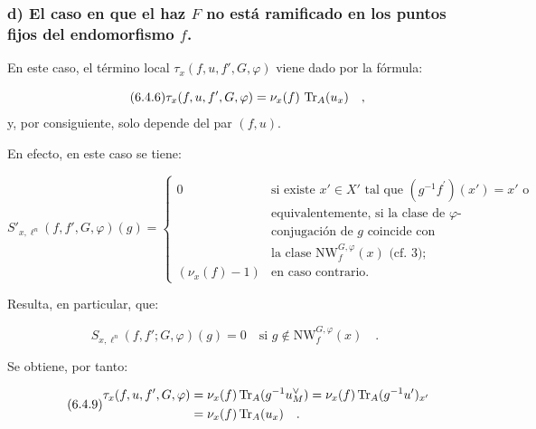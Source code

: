 \subsubsection*{d) El caso en que el haz $F$ no está ramificado en los puntos fijos del endomorfismo $f$.}

En este caso, el término local $\tau_x(f,u, f', G, \varphi)$ viene dado por la fórmula:

\begin{equation}\tag{6.4.6}
\tau_x(f,u, f', G, \varphi) = \nu_x(f) \, \operatorname{Tr}_A(u_x) \quad ,
\end{equation}
y, por consiguiente, solo depende del par $(f,u)$.

En efecto, en este caso se tiene:

\begin{equation}\tag{6.4.7}
S'_{x,\ell^n}(f, f', G, \varphi)(g) = \begin{cases}
0 & \text{si existe } x' \in X' \text{ tal que } (g^{-1}f^{\prime})(x') = x' \text{ o}\\
& \text{equivalentemente, si la clase de $\varphi$-}\\
& \text{conjugación de $g$ coincide con}\\
& \text{la clase } \mathrm{NW}_{f}^{G,\varphi}(x) \text{ (cf. 3); }\\
(\nu_x(f)-1) & \text{en caso contrario.}
\end{cases}
\end{equation}

Resulta, en particular, que:

\begin{equation}\tag{6.4.8}
S_{x,\ell^n}(f, f'; G, \varphi)(g) = 0 \quad \text{si } g \notin \mathrm{NW}_{f}^{G,\varphi}(x) \quad .
\end{equation}

Se obtiene, por tanto:

\begin{equation}\tag{6.4.9}
\begin{aligned}
\tau_x(f,u, f', G, \varphi) &= \nu_x(f) \operatorname{Tr}_A(g^{-1}u_M^\vee) = \nu_x(f) \operatorname{Tr}_A(g^{-1}u')_{x'} \\
&= \nu_x(f) \operatorname{Tr}_A(u_x) \quad .
\end{aligned}
\end{equation}
